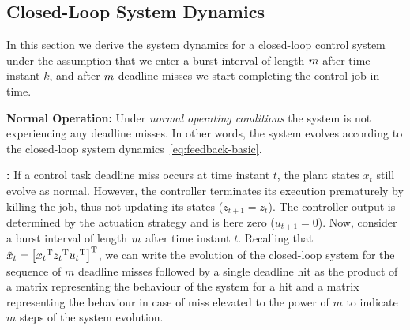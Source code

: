 \subsection{Closed-Loop System Dynamics}%
\label{sec:derivation}
In this section we derive the system dynamics for a closed-loop control system under the assumption that we enter a burst interval of length $m$ after time instant $k$, and after $m$ deadline misses we start completing the control job in time.

\textbf{Normal Operation: }%
Under \emph{normal operating conditions} the system is not experiencing any deadline misses.
In other words, the system evolves according to the closed-loop system dynamics~\eqref{eq:feedback-basic}.

\textbf{\tKZ{}: }%
%
If a control task deadline miss occurs at time instant $t$, the plant states $x_t$ still evolve as normal.
However, the controller terminates its execution prematurely by killing the job, thus not updating its states ($z_{t+1} = z_t$).
The controller output is determined by the actuation strategy and is here zero ($u_{t+1} = 0$).
Now, consider a burst interval of length $m$ after time instant $t$.
Recalling that $\tilde{x}_t = \left[ {x_t}^{\mathrm{\small{T}}} {z_t}^{\mathrm{\small{T}}} {u_t}^{\mathrm{\small{T}}} \right]^{\mathrm{\small{T}}}$, we can write the evolution of the closed-loop system for the sequence of $m$ deadline misses followed by a single deadline hit as the product of a matrix representing the behaviour of the system for a hit and a matrix representing the behaviour in case of miss elevated to the power of $m$ to indicate $m$ steps of the system evolution.

